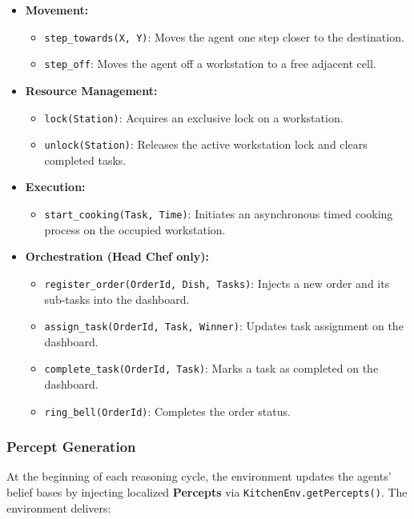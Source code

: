 \documentclass{scrartcl}
\begin{document}
\begin{itemize}
\item \textbf{Movement:}
\begin{itemize}
  \item \texttt{step\_towards(X, Y)}: Moves the agent one step closer to the destination.
  \item \texttt{step\_off}: Moves the agent off a workstation to a free adjacent cell.
\end{itemize}

\item \textbf{Resource Management:}
\begin{itemize}
  \item \texttt{lock(Station)}: Acquires an exclusive lock on a workstation.
  \item \texttt{unlock(Station)}: Releases the active workstation lock and clears completed tasks.
\end{itemize}
  
\item \textbf{Execution:}
\begin{itemize}
  \item \texttt{start\_cooking(Task, Time)}: Initiates an asynchronous timed cooking process on the occupied workstation.
\end{itemize}
  
\item \textbf{Orchestration (Head Chef only):}
\begin{itemize}
  \item \texttt{register\_order(OrderId, Dish, Tasks)}: Injects a new order and its sub-tasks into the dashboard.
  \item \texttt{assign\_task(OrderId, Task, Winner)}: Updates task assignment on the dashboard.
  \item \texttt{complete\_task(OrderId, Task)}: Marks a task as completed on the dashboard.
  \item \texttt{ring\_bell(OrderId)}: Completes the order status.
\end{itemize}
\end{itemize}

\subsubsection{Percept Generation}
At the beginning of each reasoning cycle, the environment updates the agents' belief bases by injecting localized \textbf{Percepts} via \texttt{KitchenEnv.getPercepts()}. The environment delivers:
\end{document}
